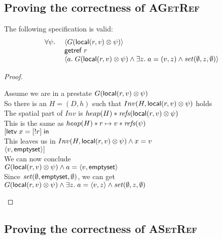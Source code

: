 \subsection{Proving the correctness of \textsc{AGetRef}}


\begin{prop*}
The following specification is valid: 
\begin{displaymath}
\begin{array}{ll}
    \forall \psi.\; 
    &  \left<G(\mathsf{local}({r}, {v}) \otimes \psi)\right> \\
    &  \mathsf{getref}\; r \\
    &  \left<a.\; G(\mathsf{local}({r}, {v}) \otimes \psi) 
                  \land  \exists z.\;a = (v,z) \land \mathit{set}(\emptyset, z, \emptyset)
       \right> \\
     \end{array}
\end{displaymath}
\end{prop*}
\begin{proof}
\begin{tabbedproof}
\oo Assume we are in a prestate $G(\mathsf{local}({r}, {v}) \otimes \psi)$ \\
\oo So there is an $H = (D,h)$ such that $Inv(H, \mathsf{local}({r}, {v}) \otimes \psi)$ holds \\
\oo The spatial part of $Inv$ is $heap(H) * \mathit{refs}(\mathsf{local}({r}, {v}) \otimes \psi)$ \\
\oo This is the same as $heap(H) * {r}\mapsto{v} * \mathit{refs}(\psi)$ \\
\oo $[\mathsf{letv}\;x = [!r]\;\mathsf{in}\;$ \\
\oo This leaves us in $Inv(H, \mathsf{local}({r}, {v}) \otimes \psi) \land x = v$ \\
\oo $\left<{v},{\mathsf{emptyset}}\right>]$ \\
\oo We can now conclude \\
\oo $G(\mathsf{local}({r}, {v}) \otimes \psi) \land a = \left<{v},{\mathsf{emptyset}}\right>$ \\
\oo Since $\mathit{set}(\emptyset, \mathsf{emptyset}, \emptyset)$, we can get \\
\oo $G(\mathsf{local}({r}, {v}) \otimes \psi) \land \exists z.\; a = \left<{v},{z}\right> \land \mathit{set}(\emptyset, z, \emptyset)$ \\

\end{tabbedproof}
\end{proof}

\subsection{Proving the correctness of \textsc{ASetRef}}

